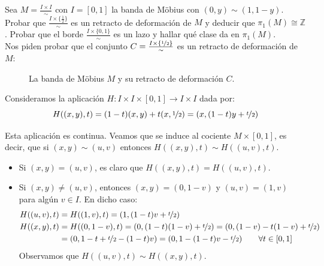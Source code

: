 \documentclass[12pt]{article}
\begin{document}
    \begin{ejercicio}
        Sea $M = \frac{I\times I}{\sim}$ con $I = [0,1]$ la banda de Möbius con $(0,y)\sim (1,1-y)$. Probar que $\frac{I\times \{\frac{1}{2}\}}{\sim}$ es un retracto de deformación de $M$ y deducir que $\pi_1(M) \cong \mathbb{Z}$. Probar que el borde $\frac{I\times \{0,1\}}{\sim}$ es un lazo y hallar qué clase da en $\pi_1(M)$.\\

        \noindent
        Nos piden probar que el conjunto $C=\frac{I\times \{\nicefrac{1}{2}\}}{\sim}$ es un retracto de deformación de $M$:
        \begin{figure}[H]
            \centering
            \caption{La banda de Möbius $M$ y su retracto de deformación $C$.}
        \end{figure}
        \noindent
        Consideramos la aplicación $H:I\times I\times [0,1]\to I\times I$ dada por:
        \begin{equation*}
            H((x,y),t) = (1-t)(x,y) + t(x,\nicefrac{1}{2}) = (x, (1-t)y + \nicefrac{t}{2})
        \end{equation*}

        Esta aplicación es continua. Veamos que se induce al cociente $M\times [0,1]$, es decir, que si $(x,y)\sim (u,v)$ entonces $H((x,y),t)\sim H((u,v),t)$.
        \begin{itemize}
            \item Si $(x,y) = (u,v)$, es claro que $H((x,y),t) = H((u,v),t)$.
            \item Si $(x,y) \neq (u,v)$, entonces $(x,y) = (0,1-v)$ y $(u,v) = (1,v)$ para algún $v\in I$. En dicho caso:
                \begin{align*}
                    H((u,v),t) &= H((1,v),t) = (1, (1-t)v + \nicefrac{t}{2})  \\
                    H((x,y),t) &= H((0,1-v),t) = (0, (1-t)(1-v) + \nicefrac{t}{2}) = (0, (1-v)-t(1-v)+\nicefrac{t}{2}) \\
                           &= (0, 1-t+\nicefrac{t}{2}-(1-t)v) = (0,1-(1-t)v - \nicefrac{t}{2}) \qquad \forall t\in [0,1]
                \end{align*}
                Observamos que $H((u,v),t)\sim H((x,y),t)$.
        \end{itemize}


\end{ejercicio}
\end{document}
